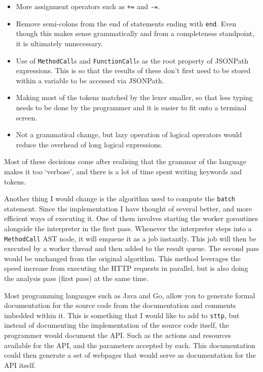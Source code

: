 \begin{itemize}
    \item More assignment operators such as \verb|+=| and \verb|-=|.
    \item Remove semi-colons from the end of statements ending with \verb|end|. Even though this makes sense grammatically and from a completeness standpoint, it is ultimately unnecessary.
    \item Use of \verb|MethodCall|s and \verb|FunctionCall|s as the root property of JSONPath expressions. This is so that the results of these don't first need to be stored within a variable to be accessed via JSONPath.
    \item Making most of the tokens matched by the lexer smaller, so that less typing needs to be done by the programmer and it is easier to fit onto a terminal screen.
    \item Not a grammatical change, but lazy operation of logical operators would reduce the overhead of long logical expressions.
\end{itemize}

Most of these decisions come after realising that the grammar of the language makes it too `verbose', and there is a lot of time spent writing keywords and tokens.

Another thing I would change is the algorithm used to compute the \verb|batch| statement. Since the implementation I have thought of several better, and more efficient ways of executing it. One of them involves starting the worker goroutines alongside the interpreter in the first pass. Whenever the interpreter steps into a \verb|MethodCall| AST node, it will enqueue it as a job instantly. This job will then be executed by a worker thread and then added to the result queue. The second pass would be unchanged from the original algorithm. This method leverages the speed increase from executing the HTTP requests in parallel, but is also doing the analysis pass (first pass) at the same time.

Most programming languages such as Java and Go, allow you to generate formal documentation for the source code from the documentation and comments imbedded within it. This is something that I would like to add to \verb|sttp|, but instead of documenting the implementation of the source code itself, the programmer would document the API. Such as the actions and resources available for the API, and the parameters accepted by each. This documentation could then generate a set of webpages that would serve as documentation for the API itself.

